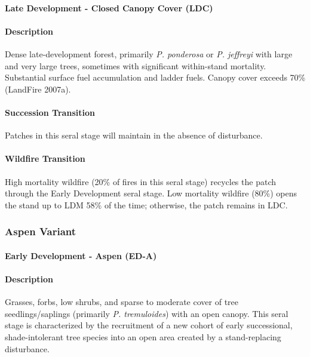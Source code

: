 \paragraph*{Late Development - Closed Canopy Cover (LDC)}

\paragraph*{Description} Dense late-development forest, primarily \emph{P. ponderosa} or \emph{P. jeffreyi} with large and very large trees, sometimes with significant within-stand mortality. Substantial surface fuel accumulation and ladder fuels. Canopy cover exceeds 70\% (LandFire 2007a).

\paragraph*{Succession Transition} Patches in this seral stage will maintain in the absence of disturbance.

\paragraph*{Wildfire Transition} High mortality wildfire (20\% of fires in this seral stage) recycles the patch through the Early Development seral stage. Low mortality wildfire (80\%) opens the stand up to LDM 58\% of the time; otherwise, the patch remains in LDC.

\noindent\hrulefill
\noindent\hrulefill

\subsubsection*{Aspen Variant}

\paragraph*{Early Development - Aspen (ED-A)}

\paragraph*{Description} Grasses, forbs, low shrubs, and sparse to moderate cover of tree seedlings/saplings (primarily \emph{P. tremuloides}) with an open canopy. This seral stage is characterized by the recruitment of a new cohort of early successional, shade-intolerant tree species into an open area created by a stand-replacing disturbance. 


